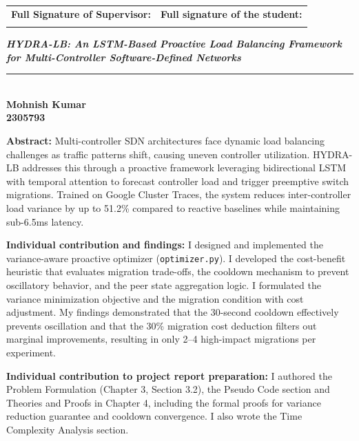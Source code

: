 \documentclass[12pt,a4paper]{report}
\newcommand{\ProjectTitle}{HYDRA-LB: An LSTM-Based Proactive Load Balancing Framework for Multi-Controller Software-Defined Networks}
\begin{document}
\vspace{1.5cm}
\noindent\begin{tabular}{p{7cm}p{7cm}}
\textbf{Full Signature of Supervisor:} & \textbf{Full signature of the student:} \\
\dotfill & \dotfill \\
\end{tabular}

\newpage
\thispagestyle{fancy}
\begin{center}
{\large \textbf{\textit{\ProjectTitle}}}\\
\rule{\textwidth}{0.4pt}\\[1cm]

{\Large \textbf{Mohnish Kumar}}\\
{\large \textbf{2305793}}\\[0.8cm]
\end{center}

\noindent\textbf{Abstract:} Multi-controller SDN architectures face dynamic load balancing challenges as traffic patterns shift, causing uneven controller utilization. HYDRA-LB addresses this through a proactive framework leveraging bidirectional LSTM with temporal attention to forecast controller load and trigger preemptive switch migrations. Trained on Google Cluster Traces, the system reduces inter-controller load variance by up to 51.2\% compared to reactive baselines while maintaining sub-6.5ms latency.

\vspace{0.5cm}
\noindent\textbf{Individual contribution and findings:} I designed and implemented the variance-aware proactive optimizer (\texttt{optimizer.py}). I developed the cost-benefit heuristic that evaluates migration trade-offs, the cooldown mechanism to prevent oscillatory behavior, and the peer state aggregation logic. I formulated the variance minimization objective and the migration condition with cost adjustment. My findings demonstrated that the 30-second cooldown effectively prevents oscillation and that the 30\% migration cost deduction filters out marginal improvements, resulting in only 2--4 high-impact migrations per experiment.

\vspace{0.5cm}
\noindent\textbf{Individual contribution to project report preparation:} I authored the Problem Formulation (Chapter 3, Section 3.2), the Pseudo Code section and Theories and Proofs in Chapter 4, including the formal proofs for variance reduction guarantee and cooldown convergence. I also wrote the Time Complexity Analysis section.
\end{document}
